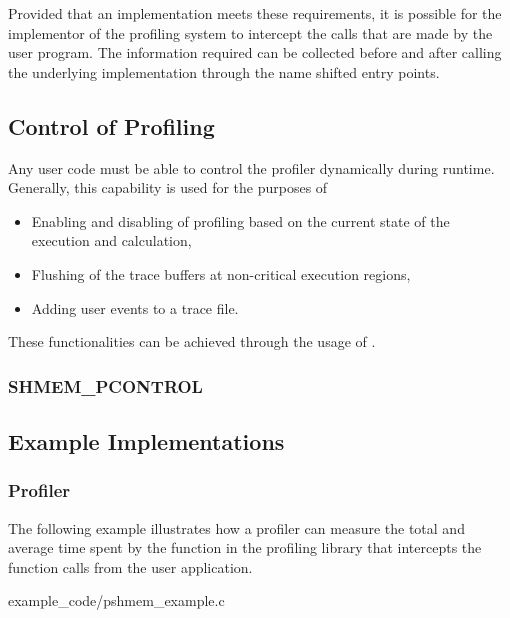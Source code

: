 Provided that an \openshmem implementation meets these requirements, 
it is possible for the implementor of the profiling system 
to intercept the \openshmem calls that are made by the user 
program. The information required can be collected before and after 
calling the underlying \openshmem implementation through the name 
shifted entry points. 

\subsection{Control of Profiling}
\label{sec:pshmem_control_profile}
Any user code must be able to control the profiler dynamically 
during runtime. Generally, this capability is used for the 
purposes of

\begin{itemize}
\item Enabling and disabling of profiling based on the current 
state of the execution and calculation,
\item Flushing of the trace buffers at non-critical execution 
regions,
\item Adding user events to a trace file.
\end{itemize}

These functionalities can be achieved through the usage of 
.

\subsubsection{\textbf{SHMEM\_PCONTROL}}\label{subsec:shmem_pcontrol}




\subsection{Example Implementations}
\label{sec:pshmem_example_implementations}

\subsubsection{Profiler}
\label{sec:pshmem_example_profiler}

The following example illustrates how a profiler can measure the
total and average time spent by the  
function in the profiling library that intercepts the \openshmem 
function calls from the user application.


      {example_code/pshmem_example.c}

